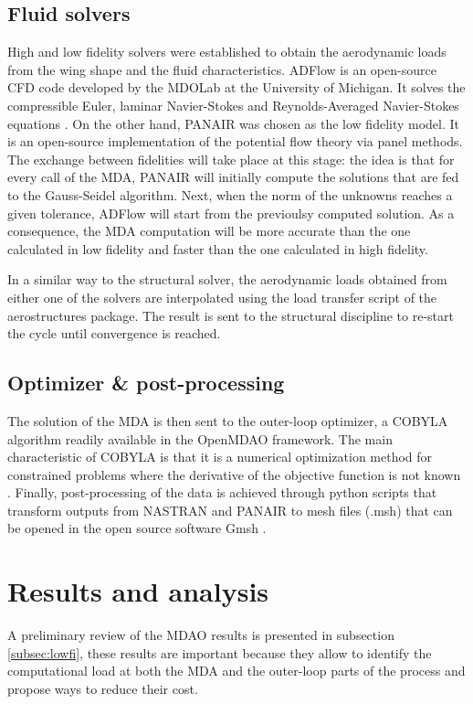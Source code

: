 \subsection{Fluid solvers}
High and low fidelity solvers were established to obtain the aerodynamic loads from the wing shape and the fluid characteristics. ADFlow is an open-source CFD code developed by the MDOLab at the University of Michigan. It solves the compressible Euler, laminar Navier-Stokes and Reynolds-Averaged Navier-Stokes equations \cite{lyu2013automatic}. On the other hand, PANAIR \cite{carmichael1981pan} was chosen as the low fidelity model. It is an open-source implementation of the potential flow theory via panel methods. The exchange between fidelities will take place at this stage: the idea is that for every call of the MDA, PANAIR will initially compute the solutions that are fed to the Gauss-Seidel algorithm. Next, when the norm of the unknowns reaches a given tolerance, ADFlow will start from the previoulsy computed solution. As a consequence, the MDA computation will be more accurate than the one calculated in low fidelity and faster than the one calculated in high fidelity. \par 
In a similar way to the structural solver, the aerodynamic loads obtained from either one of the solvers are interpolated using the load transfer script of the aerostructures package. The result is sent to the structural discipline to re-start the cycle until convergence is reached. 
\subsection{Optimizer \& post-processing}
The solution of the MDA is then sent to the outer-loop optimizer, a COBYLA algorithm readily available in the OpenMDAO framework.  The main characteristic of COBYLA is that it is a numerical optimization method for constrained problems where the derivative of the objective function is not known \cite{powell1994direct}. Finally, post-processing of the data is achieved through python scripts that transform outputs from NASTRAN and PANAIR to mesh files (.msh) that can be opened in the open source software Gmsh \cite{geuzaine2009gmsh}. 

\section{Results and analysis}
\label{sec:results}
A preliminary review of the MDAO results is presented in subsection \ref{subsec:lowfi}, these results are important because they allow to identify the computational load at both the MDA and the outer-loop parts of the process and propose ways to reduce their cost. 
